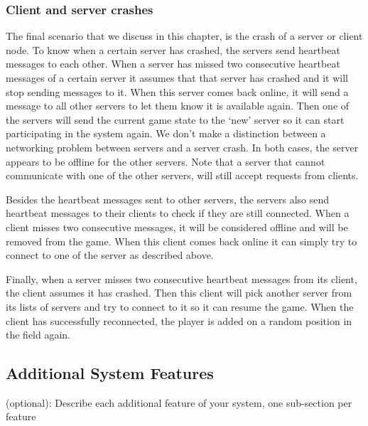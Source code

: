 \subsubsection{Client and server crashes}
\label{sec:client_server_crashes}
The final scenario that we discuss in this chapter, is the crash of a server or client node. To know when a certain server has crashed, the servers send heartbeat messages to each other. When a server has missed two consecutive heartbeat messages of a certain server it assumes that that server has crashed and it will stop sending messages to it. When this server comes back online, it will send a message to all other servers to let them know it is available again. Then one of the servers will send the current game state to the `new' server so it can start participating in the system again. We don't make a distinction between a networking problem between servers and a server crash. In both cases, the server appears to be offline for the other servers. Note that a server that cannot communicate with one of the other servers, will still accept requests from clients.

Besides the heartbeat messages sent to other servers, the servers also send heartbeat messages to their clients to check if they are still connected. When a client misses two consecutive messages, it will be considered offline and will be removed from the game. When this client comes back online it can simply try to connect to one of the server as described above.

Finally, when a server misses two consecutive heartbeat messages from its client, the client assumes it has crashed. Then this client will pick another server from its lists of servers and try to connect to it so it can resume the game. When the client has successfully reconnected, the player is added on a random position in the field again.

\subsection{Additional System Features}
\label{sec:additional_features}
(optional): Describe each additional feature of your system, one sub-section per feature
 
